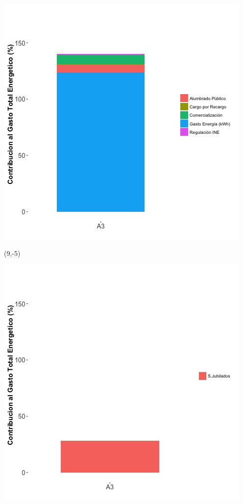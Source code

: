 \documentclass{article}\usepackage[]{graphicx}\usepackage[]{color}
\newenvironment{knitrout}{}{} %
\begin{document}
\begin{knitrout}
\color{fgcolor}
\includegraphics[scale=0.65]{figure/A3_costvars_plot.jpg} 
\end{knitrout}

 \begin{textblock}{1}(9,-5)
\begin{minipage}{20em}
\begingroup

\endgroup
\end{minipage}
\end{textblock}

\begin{knitrout}
\color{fgcolor}
\includegraphics[scale=0.65]{figure/A3_subvars_plot.jpg} 
\end{knitrout}
\end{document}
